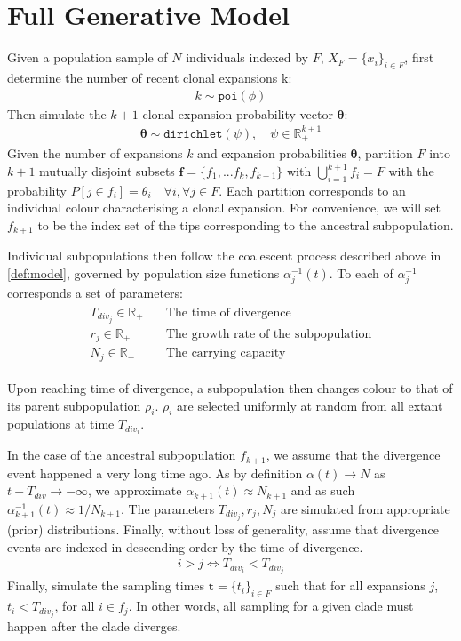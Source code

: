 \documentclass{report}
\newcommand{\R}{\mathbb{R}}
\theoremstyle{definition}
\begin{document}
\section{Full Generative Model}
Given a population sample of $N$ individuals indexed by $F$, $X_F = \{x_i\}_{i \in F}$, first determine the number of recent clonal expansions k:
\begin{gather}
k \sim \texttt{poi}(\phi)
\end{gather}
Then simulate the $k+1$ clonal expansion probability vector $\pmb{\theta}$:
\begin{gather}
\pmb{\theta} \sim \texttt{dirichlet}(\psi), \quad \psi \in \R_+^{k+1} 
\end{gather}
Given the number of expansions $k$ and expansion probabilities $\pmb{\theta}$, partition $F$ into $k+1$ mutually disjoint subsets $\mathbf{f}=\{f_1, ... f_k, f_{k+1}\}$ with $\bigcup\limits_{i=1}^{k+1} f_{i} = F$ with the probability $P[j\in f_{i}]=\theta_i\quad \forall i,\forall j \in F$.  
Each partition corresponds to an individual colour characterising a clonal expansion. For convenience, we will set $f_{k+1}$ to be the index set of the tips corresponding to the ancestral subpopulation.

Individual subpopulations then follow the coalescent process described above in \ref{def:model}, governed by population size functions $\alpha^{-1}_{j}(t)$. To each of $\alpha^{-1}_{j}$ corresponds a set of parameters:
\begin{gather}
\begin{aligned}
T_{div_{j}}\in\R_+ \quad&\text{The time of divergence}\\
r_j\in\R_+\quad&\text{The growth rate of the subpopulation}\\
N_j\in\R_+\quad&\text{The carrying capacity}
\end{aligned}
\end{gather}

Upon reaching time of divergence, a subpopulation then changes colour to that of its parent subpopulation $\rho_i$. $\rho_i$ are selected uniformly at random from all extant populations at time $T_{div_{i}}$.

In the case of the ancestral subpopulation $f_{k+1}$, we assume that the divergence event happened a very long time ago. As by definition $\alpha(t) \rightarrow N$ as $t-T_{div}\rightarrow -\infty$, we approximate $\alpha_{k+1}(t) \approx N_{k+1}$ and as such $\alpha^{-1}_{k+1}(t) \approx 1/N_{k+1}$. The parameters $T_{div_{j}}, r_j, N_j$ are simulated from appropriate (prior) distributions.
Finally, without loss of generality, assume that divergence events are indexed in descending order by the time of divergence.
\begin{gather}
i > j \Leftrightarrow T_{div_i} < T_{div_j}  
\end{gather}
Finally, simulate the sampling times $\mathbf{t}=\{t_i\}_{i\in F}$ such that for all expansions $j$, $t_i < T_{div_j}$, for all $i \in f_j$. In other words, all sampling for a given clade must happen after the clade diverges. 
\end{document}
